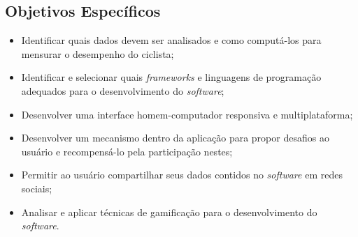 \subsection{Objetivos Específicos}
\begin{itemize}
\item Identificar quais dados devem ser analisados e como computá-los para mensurar o desempenho do ciclista;
\item Identificar e selecionar quais \textit{frameworks} e linguagens de programação adequados para o desenvolvimento do \textit{software};
\item Desenvolver uma interface homem-computador responsiva e multiplataforma;
\item Desenvolver um mecanismo dentro da aplicação para propor desafios ao usuário e recompensá-lo pela participação nestes;
\item Permitir ao usuário compartilhar seus dados contidos no \textit{software} em redes sociais;
\item Analisar e aplicar técnicas de gamificação para o desenvolvimento do \textit{software}.
\end{itemize}

